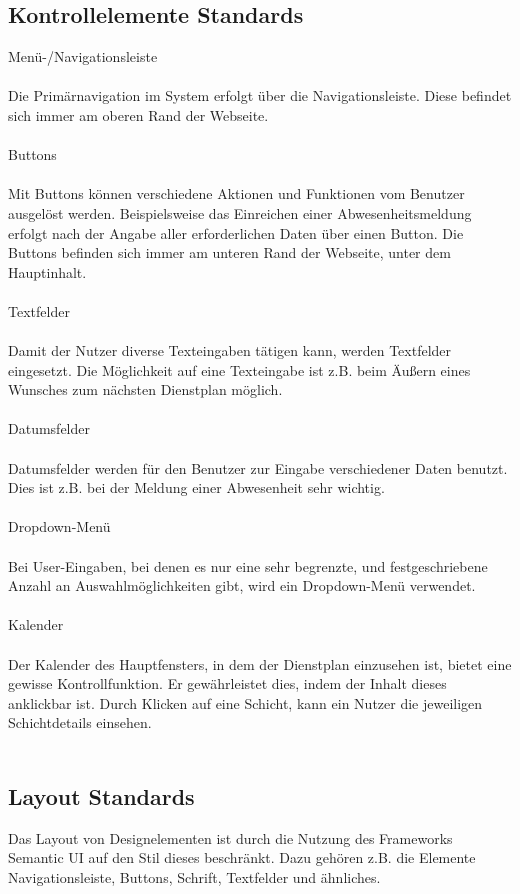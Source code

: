 \documentclass[11pt,
paper=a4,
bibtotocnumbered,	  %
liststotocnumbered,  %
DIV=calc,		  %
tablecaptionabove,	  %
headinclude,
]{article}
\begin{document}
\subsection{Kontrollelemente Standards}
Menü-/Navigationsleiste\\\\
Die Primärnavigation im System erfolgt über die Navigationsleiste. Diese befindet sich immer am oberen Rand der Webseite.\\\\
Buttons\\\\
Mit Buttons können verschiedene Aktionen und Funktionen vom Benutzer ausgelöst werden. Beispielsweise das Einreichen einer Abwesenheitsmeldung erfolgt nach der Angabe aller erforderlichen Daten über einen Button. Die Buttons befinden sich immer am unteren Rand der Webseite, unter dem Hauptinhalt. \\\\
Textfelder\\\\
Damit der Nutzer diverse Texteingaben tätigen kann, werden Textfelder eingesetzt. Die Möglichkeit auf eine Texteingabe ist z.B. beim Äußern eines Wunsches zum nächsten Dienstplan möglich. \\\\
Datumsfelder\\\\
Datumsfelder werden für den Benutzer zur Eingabe verschiedener Daten benutzt. Dies ist z.B. bei der Meldung einer Abwesenheit sehr wichtig. \\\\
Dropdown-Menü\\\\
Bei User-Eingaben, bei denen es nur eine sehr begrenzte, und festgeschriebene Anzahl an Auswahlmöglichkeiten gibt, wird ein Dropdown-Menü verwendet.\\\\
Kalender\\\\
Der Kalender des Hauptfensters, in dem der Dienstplan einzusehen ist, bietet eine gewisse Kontrollfunktion. Er gewährleistet dies, indem der Inhalt dieses anklickbar ist. Durch Klicken auf eine Schicht, kann ein Nutzer die jeweiligen Schichtdetails einsehen.\\\\
\subsection{Layout Standards}
Das Layout von Designelementen ist durch die Nutzung des Frameworks Semantic UI auf den Stil dieses beschränkt. Dazu gehören z.B. die Elemente Navigationsleiste, Buttons, Schrift, Textfelder und ähnliches.
\end{document}
